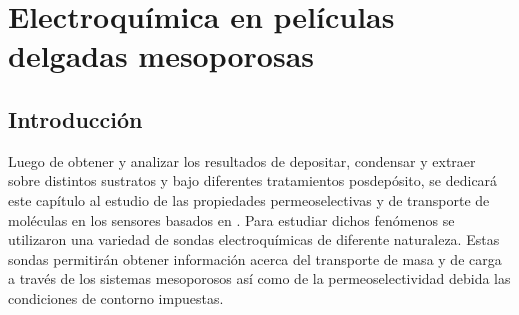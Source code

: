  \newcommand{\NoBiblioEQ}[1]{
 \ifthenelse{\equal{#1}{verdadero}}{}{}
 \NoBiblioEQ{verdadero}}


 \FormatoCapituloDosLineas
 
 \chapter{Electroquímica en películas delgadas mesoporosas}
 \label{chap:Electroquimica}

 \thispagestyle{empty}
	

 \vfill
 \minitoc
 \newpage

\section{Introducción}

	Luego de obtener y analizar los resultados de depositar, condensar y extraer \pdm\space sobre distintos sustratos y bajo diferentes tratamientos posdepósito, se dedicará este capítulo al estudio de las propiedades permeoselectivas y de transporte de moléculas en los sensores basados en \pdm. Para estudiar dichos fenómenos se utilizaron una variedad de sondas electroquímicas de diferente naturaleza. Estas sondas permitirán obtener información acerca del transporte de masa y de carga a través de los sistemas mesoporosos así como de la permeoselectividad debida las condiciones de contorno impuestas. 

